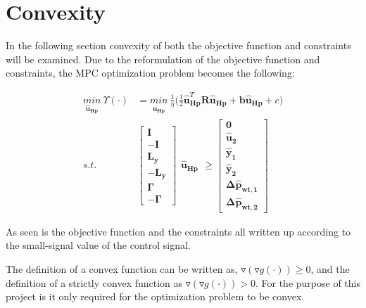 \section{Convexity}
\label{convexity}
In the following section convexity of both the objective function and constraints will be examined. 
Due to the reformulation of the objective function and constraints, the MPC optimization problem becomes the following: 

\begin{align}
\underset{\bm{\hat{u}_{Hp}}}{min} \:  \Upsilon(\cdot) &= \underset{\bm{\hat{u}_{Hp}}}{min} \:  \frac{1}{\eta}\bigg( \frac{1}{2} \bm{\hat{u}}_{\bm{Hp}}^{T} \bm{R} \bm{\hat{u}}_{\bm{Hp}} + \bm{b} \bm{\hat{u}}_{\bm{Hp}} + c \bigg)\\
\label{eq:obj_final1}
%
s.t. \:\:\:\:\:	&\begin{bmatrix}
		\bm{I} 	\\
		-\bm{I} 	\\
		\bm{L_{y}}	\\
		-\bm{L_{y}}	\\
		\bm{\Gamma}	\\
		-\bm{\Gamma}
	\end{bmatrix}
	\begin{matrix}
			\bm{\hat{u}_{Hp}}
	\end{matrix}
	\geq 
	\begin{bmatrix}
			\bm{0}	\\
			\bm{\hat{u}_{2}}	\\
			\bm{\hat{y}_{1}}	\\
			\bm{\hat{y}_{2}}	\\
			\bm{\Delta \hat{p}_{wt,1}}	\\
			\bm{\Delta \hat{p}_{wt,2}}	
	\end{bmatrix}
\end{align}

As seen is the objective function and the constraints all written up according to the small-signal value of the control signal. 

The definition of a convex function can be written as, $\triangledown(\triangledown g(\cdot)) \geq 0$,  and the definition of a strictly convex function as $\triangledown(\triangledown g(\cdot)) > 0$. For the purpose of this project is it only required for the optimization problem to be convex. 


